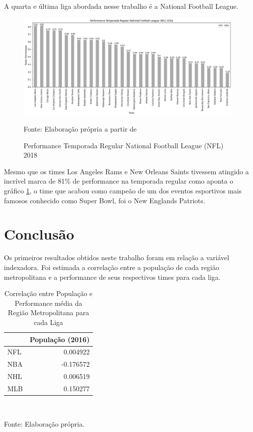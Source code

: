 \documentclass[12pt,oneside,a4paper,chapter=TITLE,english,brazil,sumario=abnt-6027-2012]{abntex2}
\begin{document}
	
	A quarta e última liga abordada nesse trabalho é a National Football League. 
	
	\begin{figure}[H]
		\centering
		\caption{Performance Temporada Regular National Football League (NFL) 2018}
		\includegraphics[scale=0.4]{../../output/figures/nfl.png}
		\label{nfl}
		\\ \vspace{0.25cm}
		\raggedright
		\footnotesize{Fonte: Elaboração própria a partir de }
	\end{figure}
	
	Mesmo que os times Los Angeles Rams e New Orleans Saints tivessem atingido a incrível marca de 81\% de performance na temporada regular como aponta o gráfico \ref{nfl}, o time que acabou como campeão de um dos eventos esportivos mais famosos conhecido como Super Bowl, foi o New Englands Patriots.

	
\chapter{Conclusão}

	Os primeiros resultados obtidos neste trabalho foram em relação a variável indexadora. Foi estimada a correlação entre a população de cada região metropolitana e a performance de seus respectivos times para cada liga. 
	
	\begin{table}[H]
	\centering
	\caption{Correlação entre População e Performance média da Região Metropolitana para cada Liga}
	\begin{tabular}{lr}\hline
	& População (2016) \\\hline
	NFL & 0.004922 \\
	NBA & -0.176572 \\
	NHL & 0.006519 \\
	MLB & 0.150277 \\\hline
	\end{tabular}
	\label{tab:corr_table}
	\\ \vspace{0.25cm}
	\raggedright
	\footnotesize{Fonte: Elaboração própria.}
	\end{table}
\end{document}
